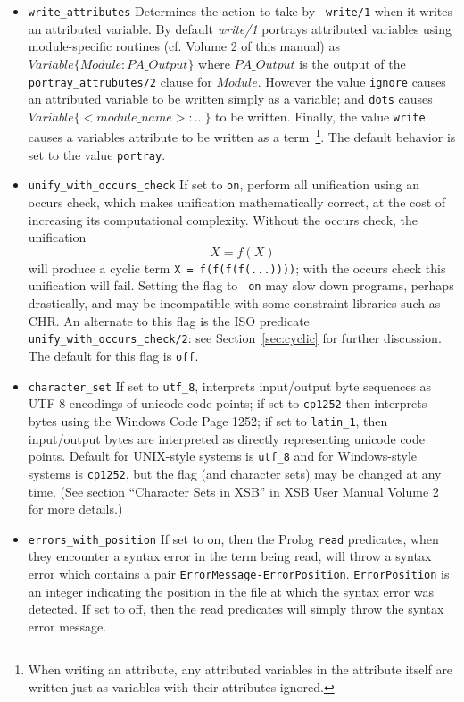 \begin{description}
\begin{itemize}
\item {\tt write\_attributes} Determines the action to take by {\tt
  write/1} when it writes an attributed variable.  By default {\em
  write/1} portrays attributed variables using module-specific
  routines (cf. Volume 2 of this manual) as $Variable \{ Module :
  PA\_Output\}$ where $PA\_Output$ is the output of the {\tt
    portray\_attrubutes/2} clause for $Module$.  However the value
  {\tt ignore} causes an attributed variable to be written simply as a
  variable; and {\tt dots} causes $Variable \{ <module\_name> : ...\}$
  to be written.  Finally, the value {\tt write} causes a variables
  attribute to be written as a term~\footnote{When writing an
    attribute, any attributed variables in the attribute itself are
    written just as variables with their attributes ignored.}.  The
  default behavior is set to the value {\tt portray}.

\item {\tt unify\_with\_occurs\_check} If set to {\tt on}, perform all
  unification using an occurs check, which makes unification
  mathematically correct, at the cost of increasing its computational
  complexity.  Without the occurs check, the unification
\[
   X = f(X)
\]
  will produce a cyclic term {\tt X = f(f(f(f(...))))}; with the
  occurs check this unification will fail.  Setting the flag to {\tt
    on} may slow down programs, perhaps drastically, and may be
  incompatible with some constraint libraries such as CHR.  An
  alternate to this flag is the ISO predicate {\tt
    unify\_with\_occurs\_check/2}: see Section~\ref{sec:cyclic} for
    further discussion.  The default for this flag is {\tt off}.
%
\item {\tt character\_set} If set to {\tt utf\_8}, interprets
input/output byte sequences as UTF-8 encodings of unicode code points;
if set to {\tt cp1252} then interprets bytes using the Windows Code
Page 1252; if set to {\tt latin\_1}, then input/output bytes are
interpreted as directly representing unicode code points.  Default for
UNIX-style systems is {\tt utf\_8} and for Windows-style systems is
{\tt cp1252}, but the flag (and character sets) may be changed at any
time.  (See section ``Character Sets in XSB'' in XSB User Manual
Volume 2 for more details.)
%
\item {\tt errors\_with\_position} If set to on, then the Prolog
{\tt read} predicates, when they encounter a syntax error in the term
being read, will throw a syntax error which contains a pair
\texttt{ErrorMessage-ErrorPosition}.  {\tt ErrorPosition} is an integer
indicating the position in the file at which the syntax error was
detected. If set to off, then the read predicates will simply throw
the syntax error message.


\end{itemize}
\end{description}
